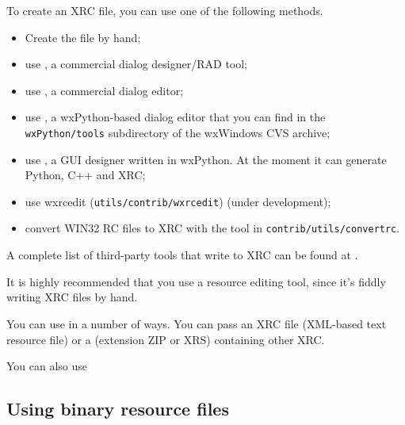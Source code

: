 To create an XRC file, you can use one of the following methods.

\begin{itemize}\itemsep=0pt
\item Create the file by hand;
\item use , a commercial dialog designer/RAD tool;
\item use , a commercial dialog editor;
\item use , a wxPython-based
dialog editor that you can find in the {\tt wxPython/tools} subdirectory of the wxWindows
CVS archive;
\item use , a GUI designer written in wxPython. At the moment it can generate Python, C++ and XRC;
\item use wxrcedit ({\tt utils/contrib/wxrcedit}) (under development);
\item convert WIN32 RC files to XRC with the tool in {\tt contrib/utils/convertrc}.
\end{itemize}

A complete list of third-party tools that write to XRC can be found at .

It is highly recommended that you use a resource editing tool, since it's fiddly writing
XRC files by hand.

You can use  in a number of ways.
You can pass an XRC file (XML-based text resource file)
or a  (extension ZIP or XRS) containing other XRC.

You can also use 

\subsection{Using binary resource files}\label{binaryresourcefiles}

